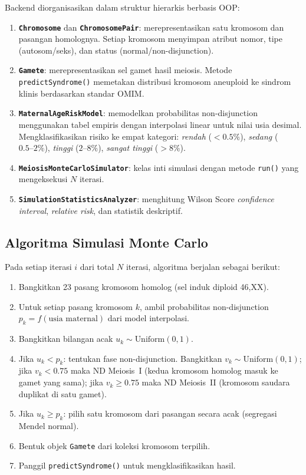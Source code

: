 \documentclass[10pt,a4paper,twocolumn]{article}
\begin{document}
Backend diorganisasikan dalam struktur hierarkis berbasis OOP:

\begin{enumerate}[leftmargin=*,noitemsep,topsep=2pt]
    \item \textbf{\texttt{Chromosome}} dan \textbf{\texttt{ChromosomePair}}: merepresentasikan
        satu kromosom dan pasangan homolognya. Setiap kromosom menyimpan atribut nomor,
        tipe (autosom/seks), dan status (normal/non-disjunction).
    \item \textbf{\texttt{Gamete}}: merepresentasikan sel gamet hasil meiosis.
        Metode \texttt{predictSyndrome()} memetakan distribusi kromosom aneuploid
        ke sindrom klinis berdasarkan standar OMIM.
    \item \textbf{\texttt{MaternalAgeRiskModel}}: memodelkan probabilitas non-disjunction
        menggunakan tabel empiris dengan interpolasi linear untuk nilai usia desimal.
        Mengklasifikasikan risiko ke empat kategori: \textit{rendah} ($<0.5\%$),
        \textit{sedang} ($0.5\text{--}2\%$), \textit{tinggi} ($2\text{--}8\%$),
        \textit{sangat tinggi} ($>8\%$).
    \item \textbf{\texttt{MeiosisMonteCarloSimulator}}: kelas inti simulasi dengan
        metode \texttt{run()} yang mengeksekusi $N$ iterasi.
    \item \textbf{\texttt{SimulationStatisticsAnalyzer}}: menghitung Wilson Score
        \textit{confidence interval}, \textit{relative risk}, dan statistik deskriptif.
\end{enumerate}

\subsection{Algoritma Simulasi Monte Carlo}

Pada setiap iterasi $i$ dari total $N$ iterasi, algoritma berjalan sebagai berikut:

\begin{enumerate}[leftmargin=*,noitemsep,topsep=2pt]
    \item Bangkitkan 23 pasang kromosom homolog (sel induk diploid 46,XX).
    \item Untuk setiap pasang kromosom $k$, ambil probabilitas non-disjunction
        $p_k = f(\text{usia maternal})$ dari model interpolasi.
    \item Bangkitkan bilangan acak $u_k \sim \text{Uniform}(0,1)$.
    \item Jika $u_k < p_k$: tentukan fase non-disjunction. Bangkitkan
        $v_k \sim \text{Uniform}(0,1)$; jika $v_k < 0.75$ maka ND Meiosis~I
        (kedua kromosom homolog masuk ke gamet yang sama); jika $v_k \geq 0.75$
        maka ND Meiosis~II (kromosom saudara duplikat di satu gamet).
    \item Jika $u_k \geq p_k$: pilih satu kromosom dari pasangan secara acak
        (segregasi Mendel normal).
    \item Bentuk objek \texttt{Gamete} dari koleksi kromosom terpilih.
    \item Panggil \texttt{predictSyndrome()} untuk mengklasifikasikan hasil.
\end{enumerate}
\end{document}
